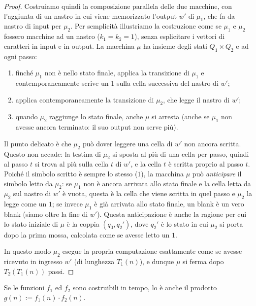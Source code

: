 \begin{proof}
Costruiamo quindi la composizione parallela delle due macchine, con l'aggiunta di un nastro in cui viene memorizzato l'output $w'$ di $\mu_1$, che fa da nastro di input per $\mu_2$. Per semplicità illustriamo la costruzione come se $\mu_1$ e $\mu_2$ fossero macchine ad un nastro ($k_1=k_2=1$), senza esplicitare i vettori di caratteri in input e in output. La macchina $\mu$ ha insieme degli stati $Q_1\times Q_2$ e ad ogni passo:
\begin{enumerate}
\item finché $\mu_1$ non è nello stato finale, applica la transizione di $\mu_1$ e contemporaneamente scrive un $1$ sulla cella successiva del nastro di $w'$;
\item applica contemporaneamente la transizione di $\mu_2$, che legge il nastro di $w'$;
\item quando $\mu_2$ raggiunge lo stato finale, anche $\mu$ si arresta (anche se $\mu_1$ non avesse ancora terminato: il suo output non serve più).
\end{enumerate}
Il punto delicato è che $\mu_2$ può dover leggere una cella di $w'$ non ancora scritta. Questo non accade: la testina di $\mu_2$ si sposta al più di una cella per passo, quindi al passo $t$ si trova al più sulla cella $t$ di $w'$, e la cella $t$ è scritta proprio al passo $t$. Poiché il simbolo scritto è sempre lo stesso ($1$), la macchina $\mu$ può \emph{anticipare} il simbolo letto da $\mu_2$: se $\mu_1$ non è ancora arrivata allo stato finale e la cella letta da $\mu_2$ sul nastro di $w'$ è vuota, questa è la cella che viene scritta in quel passo e $\mu_2$ la legge come un $1$; se invece $\mu_1$ è già arrivata allo stato finale, un blank è un vero blank (siamo oltre la fine di $w'$). Questa anticipazione è anche la ragione per cui lo stato iniziale di $\mu$ è la coppia $(q_0,q_2')$, dove $q_2'$ è lo stato in cui $\mu_2$ si porta dopo la prima mossa, calcolata come se avesse letto un $1$.

In questo modo $\mu_2$ esegue la propria computazione esattamente come se avesse ricevuto in ingresso $w'$ (di lunghezza $T_1(n)$), e dunque $\mu$ si ferma dopo $T_2(T_1(n))$ passi.
\end{proof}

\begin{prop}
Se le funzioni $f_1$ ed $f_2$ sono costruibili in tempo, lo è anche il prodotto $g(n):=f_1(n)\cdot f_2(n)$.
\end{prop}

